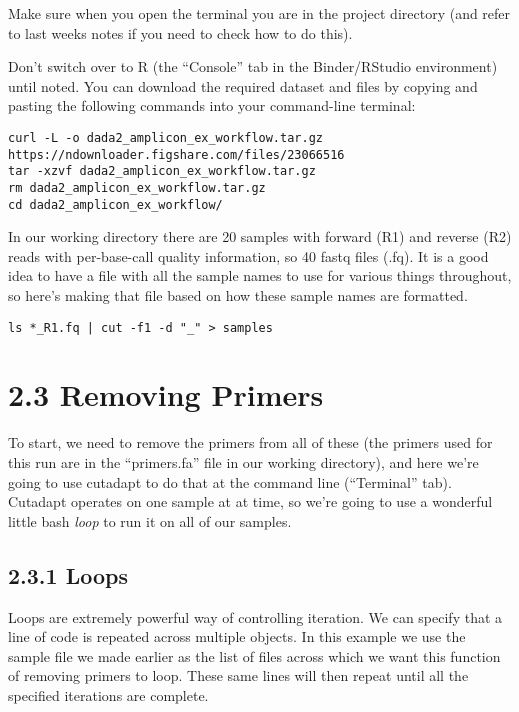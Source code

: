 \documentclass[
]{book}
\begin{document}
Make sure when you open the terminal you are in the project directory (and refer to last weeks notes if you need to check how to do this).

Don't switch over to R (the ``Console'' tab in the Binder/RStudio environment) until noted. You can download the required dataset and files by copying and pasting the following commands into your command-line terminal:

\begin{verbatim}
curl -L -o dada2_amplicon_ex_workflow.tar.gz https://ndownloader.figshare.com/files/23066516
tar -xzvf dada2_amplicon_ex_workflow.tar.gz
rm dada2_amplicon_ex_workflow.tar.gz
cd dada2_amplicon_ex_workflow/
\end{verbatim}

In our working directory there are 20 samples with forward (R1) and reverse (R2) reads with per-base-call quality information, so 40 fastq files (.fq). It is a good idea to have a file with all the sample names to use for various things throughout, so here's making that file based on how these sample names are formatted.

\begin{verbatim}
ls *_R1.fq | cut -f1 -d "_" > samples
\end{verbatim}

\hypertarget{removing-primers}{%
\section{2.3 Removing Primers}\label{removing-primers}}

To start, we need to remove the primers from all of these (the primers used for this run are in the ``primers.fa'' file in our working directory), and here we're going to use cutadapt to do that at the command line (``Terminal'' tab). Cutadapt operates on one sample at at time, so we're going to use a wonderful little bash \emph{loop} to run it on all of our samples.

\hypertarget{loops}{%
\subsection{2.3.1 Loops}\label{loops}}

Loops are extremely powerful way of controlling iteration. We can specify that a line of code is repeated across multiple objects. In this example we use the sample file we made earlier as the list of files across which we want this function of removing primers to loop. These same lines will then repeat until all the specified iterations are complete.
\end{document}
